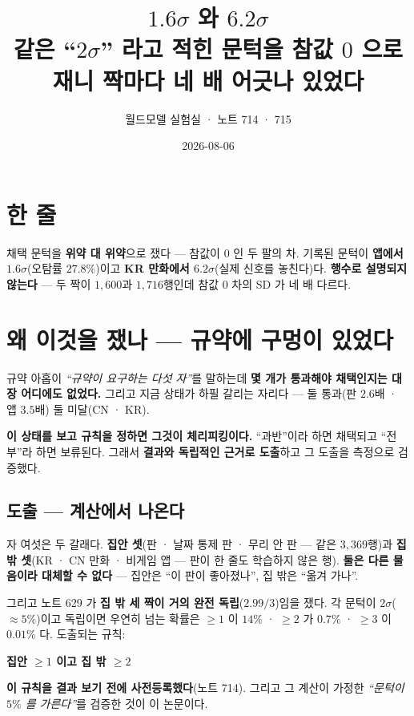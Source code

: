 \documentclass[10pt,a4paper]{article}
\title{\bfseries $1.6\sigma$ 와 $6.2\sigma$\\[2pt]
\large 같은 ``$2\sigma$'' 라고 적힌 문턱을 참값 $0$ 으로 재니 짝마다 네 배 어긋나 있었다}
\author{월드모델 실험실 · 노트 714 · 715}
\date{2026-08-06}
\begin{document}
\maketitle

\section{한 줄}

채택 문턱을 \textbf{위약 대 위약}으로 쟀다 --- 참값이 $0$ 인 두 팔의 차. 기록된
문턱이 \textbf{앱에서 $1.6\sigma$}(오탐률 $27.8\%$)이고 \textbf{KR 만화에서
$6.2\sigma$}(실제 신호를 놓친다)다. \textbf{행수로 설명되지 않는다} --- 두 짝이
$1{,}600$과 $1{,}716$행인데 참값 $0$ 차의 SD 가 네 배 다르다.

\section{왜 이것을 쟀나 --- 규약에 구멍이 있었다}

규약 아홉이 \emph{``규약이 요구하는 다섯 자''}를 말하는데 \textbf{몇 개가
통과해야 채택인지는 대장 어디에도 없었다.} 그리고 지금 상태가 하필 갈리는
자리다 --- 둘 통과(판 $2.6$배 · 앱 $3.5$배) 둘 미달(CN · KR).

\textbf{이 상태를 보고 규칙을 정하면 그것이 체리피킹이다.} ``과반''이라 하면
채택되고 ``전부''라 하면 보류된다. 그래서 \textbf{결과와 독립적인 근거로
도출}하고 그 도출을 측정으로 검증했다.

\subsection*{도출 --- 계산에서 나온다}

자 여섯은 두 갈래다. \textbf{집안 셋}(판 · 날짜 통제 판 · 무리 안 판 --- 같은
$3{,}369$행)과 \textbf{집 밖 셋}(KR · CN 만화 · 비게임 앱 --- 판이 한 줄도 학습하지
않은 행). \textbf{둘은 다른 물음이라 대체할 수 없다} --- 집안은 ``이 판이
좋아졌나'', 집 밖은 ``옮겨 가나''.

그리고 노트 629 가 \textbf{집 밖 세 짝이 거의 완전 독립}($2.99/3$)임을 쟀다.
각 문턱이 $2\sigma$($\approx 5\%$)이고 독립이면 우연히 넘는 확률은
$\ge 1$ 이 $14\%$ · $\ge 2$ 가 $0.7\%$ · $\ge 3$ 이 $0.01\%$ 다. 도출되는 규칙:

\begin{center}\textbf{집안 $\ge 1$ 이고 집 밖 $\ge 2$}\end{center}

\textbf{이 규칙을 결과 보기 전에 사전등록했다}(노트 714). 그리고 그 계산이 가정한
\emph{``문턱이 $5\%$ 를 가른다''}를 검증한 것이 이 논문이다.
\end{document}
